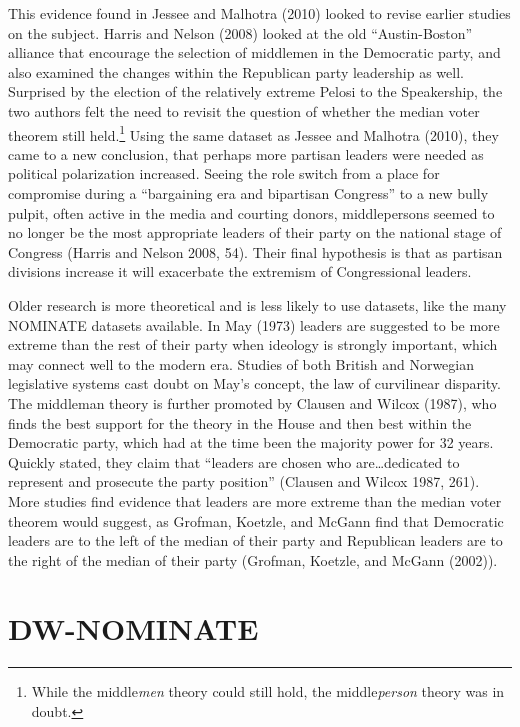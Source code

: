 \documentclass[12pt,twoside]{reedthesis}
\begin{document}
  This evidence found in Jessee and Malhotra (2010) looked to revise
  earlier studies on the subject. Harris and Nelson (2008) looked at the
  old ``Austin-Boston'' alliance that encourage the selection of middlemen
  in the Democratic party, and also examined the changes within the
  Republican party leadership as well. Surprised by the election of the
  relatively extreme Pelosi to the Speakership, the two authors felt the
  need to revisit the question of whether the median voter theorem still
  held.\footnote{While the middle\emph{men} theory could still hold, the
    middle\emph{person} theory was in doubt.} Using the same dataset as
  Jessee and Malhotra (2010), they came to a new conclusion, that perhaps
  more partisan leaders were needed as political polarization increased.
  Seeing the role switch from a place for compromise during a ``bargaining
  era and bipartisan Congress'' to a new bully pulpit, often active in the
  media and courting donors, middlepersons seemed to no longer be the most
  appropriate leaders of their party on the national stage of Congress
  (Harris and Nelson 2008, 54). Their final hypothesis is that as partisan
  divisions increase it will exacerbate the extremism of Congressional
  leaders.
  
  Older research is more theoretical and is less likely to use datasets,
  like the many NOMINATE datasets available. In May (1973) leaders are
  suggested to be more extreme than the rest of their party when ideology
  is strongly important, which may connect well to the modern era. Studies
  of both British and Norwegian legislative systems cast doubt on May's
  concept, the law of curvilinear disparity. The middleman theory is
  further promoted by Clausen and Wilcox (1987), who finds the best
  support for the theory in the House and then best within the Democratic
  party, which had at the time been the majority power for 32 years.
  Quickly stated, they claim that ``leaders are chosen who
  are\ldots{}dedicated to represent and prosecute the party position''
  (Clausen and Wilcox 1987, 261). More studies find evidence that leaders
  are more extreme than the median voter theorem would suggest, as
  Grofman, Koetzle, and McGann find that Democratic leaders are to the
  left of the median of their party and Republican leaders are to the
  right of the median of their party (Grofman, Koetzle, and McGann
  (2002)).
  
  \section{DW-NOMINATE}\label{dw-nominate}
  
\end{document}
